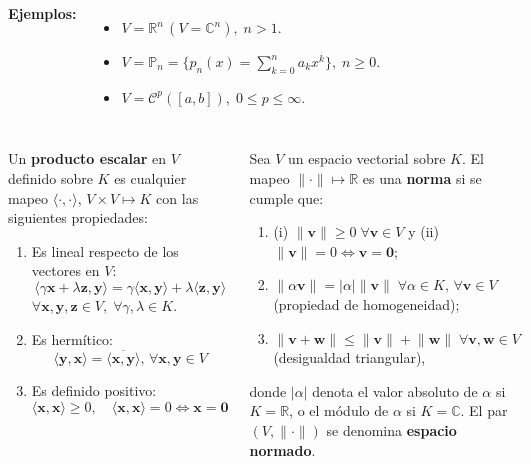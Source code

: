 \documentclass[9pt, aspectratio=169]{beamer}
\begin{document}
\begin{frame}
\begin{columns}[t]
  \textbf{Ejemplos:}
  \begin{itemize}
      \item $V = \mathbb{R}^n \, (V = \mathbb{C}^n), \; n > 1$.
      \item $V = \mathbb{P}_n = \{ p_n(x) = \sum_{k=0}^n a_k x^k \}, \; n \geq 0$.
      \item $V = \mathcal{C}^p([a, b]), \; 0 \leq p \leq \infty$.
  \end{itemize}
  \end{columns}
  \end{frame}

\begin{frame}
\begin{columns}[t]
\cx
\begin{definition}
  Un \textbf{producto escalar} en $V$ definido sobre $K$ es cualquier mapeo $\langle \cdot, \cdot \rangle$, $V \times V \mapsto K$ con las siguientes propiedades:
\begin{enumerate}
  \item Es lineal respecto de los vectores en $V$:
      \[ \langle \gamma \bm{x} + \lambda \bm{z}, \bm{y} \rangle = \gamma \langle \bm{x}, \bm{y} \rangle + \lambda \langle \bm{z}, \bm{y} \rangle \]
      $\forall \bm{x}, \bm{y}, \bm{z} \in V, \; \forall \gamma, \lambda \in K$.
  \item Es hermítico:
      \[ \langle \bm{y},\bm{x} \rangle = \overline{ \langle \bm{x}, \bm{y} \rangle }, \, \forall \bm{x}, \bm{y} \in V \]
  \item Es definido positivo:
      \[ \langle \bm{x}, \bm{x} \rangle \geq 0, \quad \langle \bm{x}, \bm{x} \rangle = 0 \Leftrightarrow \bm{x} = \bm{0} \]
\end{enumerate}
\end{definition} \pause


\cx
\begin{definition}
  Sea $V$ un espacio vectorial sobre $K$. El mapeo $\lVert \cdot \rVert \mapsto \mathbb{R}$ es una \textbf{norma} si se cumple que:
  \begin{enumerate}
      \item (i) $\lVert \bm{v} \rVert \geq 0 \; \forall \bm{v} \in V$ y (ii) $\lVert \bm{v} \rVert = 0 \Leftrightarrow \bm{v} = \bm{0}$;
      \item $\lVert \alpha \bm{v} \rVert = |\alpha| \lVert \bm{v} \rVert \; \forall \alpha \in K , \, \forall \bm{v} \in V$ (propiedad de homogeneidad);
      \item $\lVert \bm{v} + \bm{w} \rVert \leq \lVert \bm{v} \rVert + \lVert \bm{w} \rVert \; \forall \bm{v}, \bm{w} \in V$ (desigualdad triangular),
  \end{enumerate}
  donde $|\alpha|$ denota el valor absoluto de $\alpha$ si $K = \mathbb{R}$, o el módulo de $\alpha$ si $K = \mathbb{C}$. El par $(V, \lVert \cdot \rVert)$ se denomina \textbf{espacio normado}.
\end{definition}
\end{columns}
\end{frame}
\end{document}
